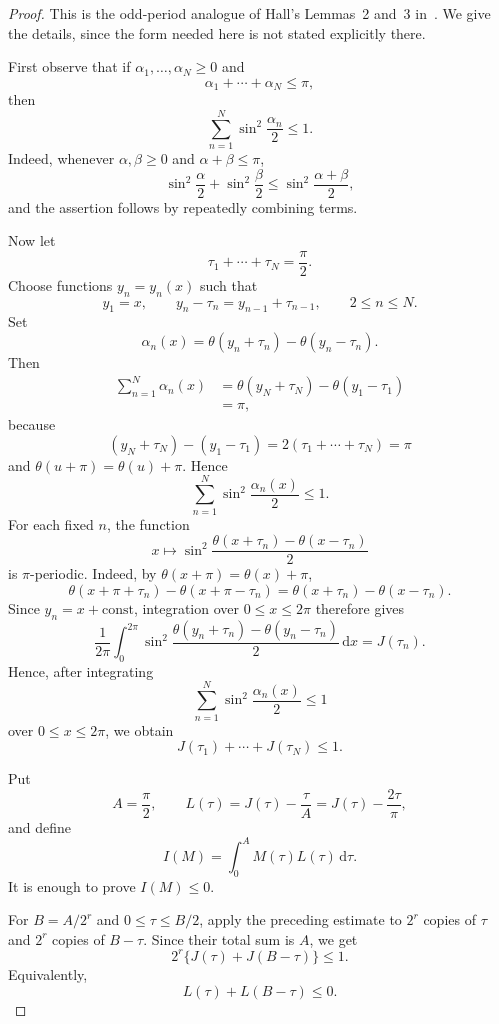 \documentclass[11pt]{amsart}
\theoremstyle{remark}
\newcommand{\dd}{\mathrm d}
\numberwithin{equation}{section}
\begin{document}
\begin{proof}
This is the odd-period analogue of Hall's Lemmas~2 and~3
in~\cite{Hall1982}. We give the details, since the form needed here is
not stated explicitly there.

First observe that if $\alpha_1,\ldots,\alpha_N\geq 0$ and
\[
        \alpha_1+\cdots+\alpha_N\leq \pi,
\]
then
\[
        \sum_{n=1}^N \sin^2\frac{\alpha_n}{2}\leq 1.
\]
Indeed, whenever $\alpha,\beta\geq 0$ and $\alpha+\beta\leq\pi$,
\[
        \sin^2\frac{\alpha}{2}
        +
        \sin^2\frac{\beta}{2}
        \leq
        \sin^2\frac{\alpha+\beta}{2},
\]
and the assertion follows by repeatedly combining terms.

Now let
\[
        \tau_1+\cdots+\tau_N=\frac{\pi}{2}.
\]
Choose functions $y_n=y_n(x)$ such that
\[
        y_1=x,
        \qquad
        y_n-\tau_n=y_{n-1}+\tau_{n-1},
        \qquad 2\leq n\leq N.
\]
Set
\[
        \alpha_n(x)
        =
        \theta(y_n+\tau_n)-\theta(y_n-\tau_n).
\]
Then
\[
\begin{aligned}
        \sum_{n=1}^N\alpha_n(x)
        &=
        \theta(y_N+\tau_N)-\theta(y_1-\tau_1)  \\
        &=\pi,
\end{aligned}
\]
because
\[
        (y_N+\tau_N)-(y_1-\tau_1)
        =
        2(\tau_1+\cdots+\tau_N)
        =
        \pi
\]
and $\theta(u+\pi)=\theta(u)+\pi$. Hence
\[
        \sum_{n=1}^N
        \sin^2\frac{\alpha_n(x)}2
        \leq 1.
\]
For each fixed $n$, the function
\[
        x\mapsto
        \sin^2\frac{\theta(x+\tau_n)-\theta(x-\tau_n)}2
\]
is $\pi$-periodic. Indeed, by $\theta(x+\pi)=\theta(x)+\pi$,
\[
        \theta(x+\pi+\tau_n)-\theta(x+\pi-\tau_n)
        =
        \theta(x+\tau_n)-\theta(x-\tau_n).
\]
Since $y_n=x+\mathrm{const}$, integration over $0\leq x\leq 2\pi$
therefore gives
\[
        \frac1{2\pi}\int_0^{2\pi}
        \sin^2\frac{\theta(y_n+\tau_n)-\theta(y_n-\tau_n)}2\,\dd x
        =
        J(\tau_n).
\]
Hence, after integrating
\[
        \sum_{n=1}^N
        \sin^2\frac{\alpha_n(x)}2
        \leq 1
\]
over $0\leq x\leq 2\pi$, we obtain
\[
        J(\tau_1)+\cdots+J(\tau_N)\leq 1.
\]

Put
\[
        A=\frac{\pi}{2},
        \qquad
        L(\tau)=J(\tau)-\frac{\tau}{A}
        =
        J(\tau)-\frac{2\tau}{\pi},
\]
and define
\[
        I(M)=\int_0^A M(\tau)L(\tau)\,\dd\tau .
\]
It is enough to prove $I(M)\leq 0$.

For $B=A/2^r$ and $0\leq \tau\leq B/2$, apply the preceding estimate to
$2^r$ copies of $\tau$ and $2^r$ copies of $B-\tau$. Since their total
sum is $A$, we get
\[
        2^r\{J(\tau)+J(B-\tau)\}\leq 1.
\]
Equivalently,
\[
        L(\tau)+L(B-\tau)\leq 0.
\]


\end{proof}
\end{document}
